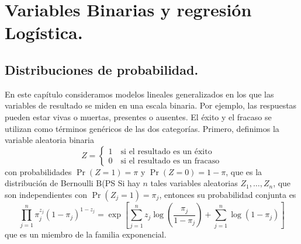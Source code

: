 \documentclass[
]{book}
\begin{document}
\hypertarget{variables-binarias-y-regresiuxf3n-loguxedstica.}{%
\chapter{Variables Binarias y regresión Logística.}\label{variables-binarias-y-regresiuxf3n-loguxedstica.}}

\hypertarget{distribuciones-de-probabilidad.}{%
\section{Distribuciones de probabilidad.}\label{distribuciones-de-probabilidad.}}

En este capítulo consideramos modelos lineales generalizados en los que las variables de resultado se miden en una escala binaria. Por ejemplo, las respuestas pueden estar vivas o muertas, presentes o ausentes. El éxito y el fracaso se utilizan como términos genéricos de las dos categorías. Primero, definimos la variable aleatoria binaria
\[
Z = \left\{\begin{array}{l}
1 \quad \text{si el resultado es un éxito} \\
0 \quad \text{si el resultado es un fracaso}
\end{array}\right.
\]
con probabilidades \(\operatorname{Pr}(Z=1) =\pi\) y \(\operatorname{Pr}(Z=0) = 1-\pi\), que es la distribución de Bernoulli \(\mathrm{B}\)(\pi PS Si hay \(n\) tales variables aleatorias \(Z_{1}, \ldots,Z_{n}\), que son independientes con \(\operatorname{Pr}\left(Z_{j} =1\right) = \pi_{j}\), entonces su probabilidad conjunta es
\begin{equation}
\prod_{j=1}^{n} \pi_{j}^{z_{j}}\left(1-\pi_{j} \right)^{1-z_{j}} = \exp\left[\sum_{j=1}^{n}z_{j}\log\left(\frac{\pi_{j}} {1- \pi_{j}} \right) + \sum_{j=1}^{n} \log\left(1-\pi_{j}\right)\right]
\end{equation}
que es un miembro de la familia exponencial.
\end{document}
